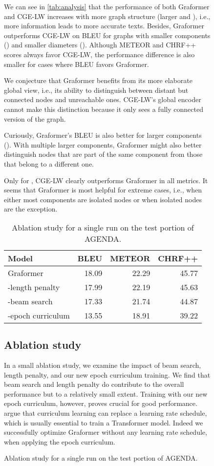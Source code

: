 \documentclass[11pt]{article}
\begin{document}
\begin{figure}
\begin{tabular}
We can see in \cref{tab:analysis} that
the performance of both Graformer and CGE-LW \citep{ribeiro20}
increases with more graph structure (larger  and ),
i.e., more information leads to more accurate texts.
Besides, Graformer outperforms CGE-LW on BLEU for graphs with smaller components ()
and smaller diameters ().
Although METEOR and CHRF++ scores always favor CGE-LW,
the performance difference is also smaller for cases where BLEU favors Graformer.

We conjecture that
Graformer benefits from its more elaborate global view,
i.e., its ability to distinguish between distant but connected nodes and unreachable ones.
CGE-LW's global encoder cannot make this distinction
because it only sees a fully connected version of the graph.

Curiously, Graformer's BLEU is also better for larger components ().
With multiple larger components,
Graformer might also better distinguish nodes that are part of the same component from those that belong to a different one.

Only for ,
CGE-LW clearly outperforms Graformer in all metrics.
It seems that Graformer is most helpful for extreme cases, i.e.,
when either most components are isolated nodes or when isolated nodes are the exception.
 

\begin{table}[t]
	\centering
	\small
	\begin{tabular}{lrrr}
		\toprule
		Model & BLEU & METEOR & CHRF++ \\
		\midrule
		Graformer & 18.09 & 22.29 & 45.77 \\
		\midrule
		-length penalty & 17.99 & 22.19 & 45.63 \\
		-beam search & 17.33 & 21.74 & 44.87 \\
		-epoch curriculum & 13.55 & 18.91 & 39.22 \\
		\bottomrule
	\end{tabular}
	\caption{Ablation study for a single run on the test portion of AGENDA.}
	\label{tab:ablation}
\end{table}

\subsection{Ablation study}

In a small ablation study, we examine the impact of beam search, length penalty,
and our new epoch curriculum training.
We find that beam search and length penalty do contribute to the overall performance but
to a relatively small extent.
Training with our new epoch curriculum, however,
proves crucial for good performance.
\citet{platanios-etal-2019-competence} argue that curriculum learning can replace a learning rate schedule,
which is usually essential to train a Transformer model.
Indeed we successfully optimize Graformer without any learning rate schedule, when applying the epoch curriculum.



\end{tabular}
\end{figure}
\end{document}

